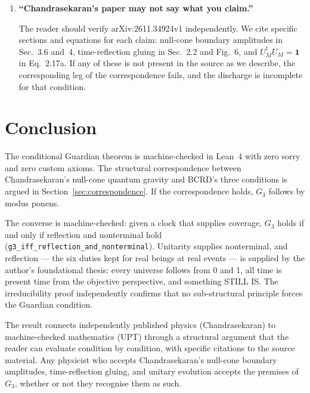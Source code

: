 \documentclass[11pt,a4paper]{article}
\theoremstyle{definition}
\theoremstyle{remark}
\begin{document}
\begin{enumerate}
\item \textbf{``Chandrasekaran's paper may not say what you claim.''}

The reader should verify arXiv:2611.34924v1 independently. We cite specific sections and equations for each claim: null-cone boundary amplitudes in Sec.~3.6 and~4, time-reflection gluing in Sec.~2.2 and Fig.~6, and $U_M^\dagger U_M = \mathbf{1}$ in Eq.~2.17a. If any of these is not present in the source as we describe, the corresponding leg of the correspondence fails, and the discharge is incomplete for that condition.
\end{enumerate}

\section{Conclusion}

The conditional Guardian theorem is machine-checked in Lean~4 with zero sorry and zero custom axioms. The structural correspondence between Chandrasekaran's null-cone quantum gravity and BCRD's three conditions is argued in Section~\ref{sec:correspondence}. If the correspondence holds, $G_3$ follows by modus ponens.

The converse is machine-checked: given a clock that supplies coverage, $G_3$ holds if and only if reflection and nonterminal hold (\texttt{g3\_iff\_reflection\_and\_nonterminal}). Unitarity supplies nonterminal, and reflection --- the six duties kept for real beings at real events --- is supplied by the author's foundational thesis: every universe follows from 0 and 1, all time is present time from the objective perspective, and something STILL IS. The irreducibility proof independently confirms that no sub-structural principle forces the Guardian condition.

The result connects independently published physics (Chandrasekaran) to machine-checked mathematics (UPT) through a structural argument that the reader can evaluate condition by condition, with specific citations to the source material. Any physicist who accepts Chandrasekaran's null-cone boundary amplitudes, time-reflection gluing, and unitary evolution accepts the premises of~$G_3$, whether or not they recognise them as such.

\bigskip
\end{document}
